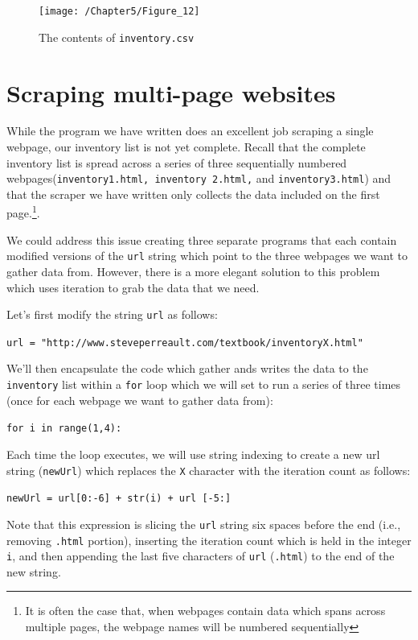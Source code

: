 \documentclass{book}
\begin{document}
\begin{figure}[h]
	\caption{The contents of \texttt{inventory.csv}}
	\centering\texttt{[image: /Chapter5/Figure\_12]}
\end{figure}

\section{Scraping multi-page websites}

While the program we have written does an excellent job scraping a single webpage, our inventory list is not yet complete. Recall that the complete inventory list is spread across a series of three sequentially numbered webpages(\texttt{inventory1.html, inventory 2.html,} and \texttt{inventory3.html}) and that the scraper we have written only collects the data included on the first page.\footnote{It is often the case that, when webpages contain data which spans across multiple pages, the webpage names will be numbered sequentially}.

We could address this issue creating three separate programs that each contain modified versions of the \texttt{url} string which point to the three webpages we want to gather data from. However, there is a more elegant solution to this problem which uses iteration to grab the data that we need. 

Let's first modify the string \texttt{url} as follows:

\texttt{url = "http://www.steveperreault.com/textbook/inventoryX.html"}

We'll then encapsulate the code which gather ands writes the data to the \texttt{inventory} list within a \texttt{for} loop which we will set to run a series of three times (once for each webpage we want to gather data from): 

\texttt{for i in range(1,4):}

Each time the loop executes, we will use string indexing to create a new url string (\texttt{newUrl}) which replaces the \texttt{X} character with the iteration count as follows:

\texttt{newUrl = url[0:-6] + str(i) + url [-5:]}

Note that this expression is slicing the \texttt{url} string six spaces before the end (i.e., removing \texttt{.html} portion), inserting the iteration count which is held in the integer \texttt{i}, and then appending the last five characters of \texttt{url} (\texttt{.html}) to the end of the new string. 
\end{document}
